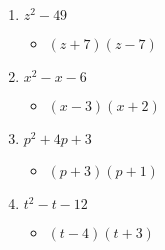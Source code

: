 \documentclass{article}
\begin{document}
\begin{onehalfspace}
\begin{enumerate}
        \item $z^{2} - 49$
        \begin{itemize}
            \item $(z + 7)(z - 7)$
        \end{itemize}

        \item $x^{2} - x - 6$
        \begin{itemize}
            \item $(x - 3)(x + 2)$
        \end{itemize}

        \item $p^{2} + 4p + 3$
        \begin{itemize}
            \item $(p + 3)(p + 1)$
        \end{itemize}

        \item $t^{2} - t - 12$
        \begin{itemize}
            \item $(t - 4)(t + 3)$
        \end{itemize}
    \end{enumerate}
\end{onehalfspace}
\end{document}
